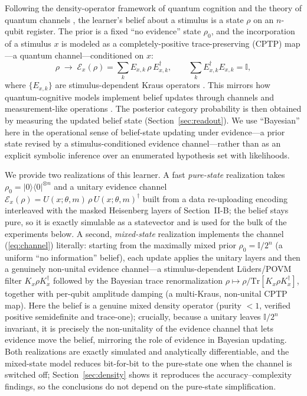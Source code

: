 \documentclass[conference]{IEEEtran}
\begin{document}
Following the density-operator framework of quantum cognition \cite{b3} and the theory of
quantum channels \cite{b12,b13,b26}, the learner's belief about a stimulus is a state
$\rho$ on an $n$-qubit register. The prior is a fixed ``no evidence'' state $\rho_0$, and
the incorporation of a stimulus $x$ is modeled as a completely-positive trace-preserving
(CPTP) map---a quantum channel---conditioned on $x$:
\begin{equation}
\rho \;\longrightarrow\; \mathcal{E}_x(\rho) = \sum_k E_{x,k}\,\rho\,E_{x,k}^{\dagger},
\qquad \sum_k E_{x,k}^{\dagger}E_{x,k} = \mathbb{I},
\label{eq:channel}
\end{equation}
where $\{E_{x,k}\}$ are stimulus-dependent Kraus operators \cite{b12,b13}. This mirrors how
quantum-cognitive models implement belief updates through channels and measurement-like
operations \cite{b3,b8,b9}. The posterior category probability is then obtained by
measuring the updated belief state (Section~\ref{sec:readout}). We use ``Bayesian'' here
in the operational sense of belief-state updating under evidence---a prior state revised
by a stimulus-conditioned evidence channel---rather than as an explicit symbolic
inference over an enumerated hypothesis set with likelihoods.

We provide two realizations of this learner. A fast \emph{pure-state} realization takes
$\rho_0=\lvert 0\rangle\!\langle 0\rvert^{\otimes n}$ and a unitary evidence channel
$\mathcal{E}_x(\rho)=U(x;\theta,m)\,\rho\,U(x;\theta,m)^{\dagger}$ built from a data
re-uploading encoding interleaved with the masked Heisenberg layers of Section~II-B; the
belief stays pure, so it is exactly simulable as a statevector and is used for the bulk of
the experiments below. A second, \emph{mixed-state} realization implements the channel
(\ref{eq:channel}) literally: starting from the maximally mixed prior $\rho_0=\mathbb{I}/2^n$
(a uniform ``no information'' belief), each update applies the unitary layers and then a
genuinely non-unital evidence channel---a stimulus-dependent L\"uders/POVM filter
$K_x\rho K_x^{\dagger}$ followed by the Bayesian trace renormalization
$\rho\mapsto\rho/\mathrm{Tr}[K_x\rho K_x^{\dagger}]$, together with per-qubit amplitude
damping (a multi-Kraus, non-unital CPTP map). Here the belief is a genuine mixed density
operator (purity $<1$, verified positive semidefinite and trace-one); crucially, because a
unitary leaves $\mathbb{I}/2^n$ invariant, it is precisely the non-unitality of the evidence
channel that lets evidence move the belief, mirroring the role of evidence in Bayesian
updating. Both realizations are exactly simulated and analytically differentiable, and the
mixed-state model reduces bit-for-bit to the pure-state one when the channel is switched
off; Section~\ref{sec:density} shows it reproduces the accuracy--complexity findings, so the
conclusions do not depend on the pure-state simplification.
\end{document}
